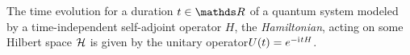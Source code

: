 The time evolution for a duration \(t\in\R\) of a quantum system modeled by a time-independent self-adjoint operator \(H\), the \emph{Hamiltonian}, acting on some Hilbert space \(\mathcal{H}\) is given by the unitary operator\footnotemark \(U(t) = e^{-\mathrm{i}\mkern1mu t H}\).











